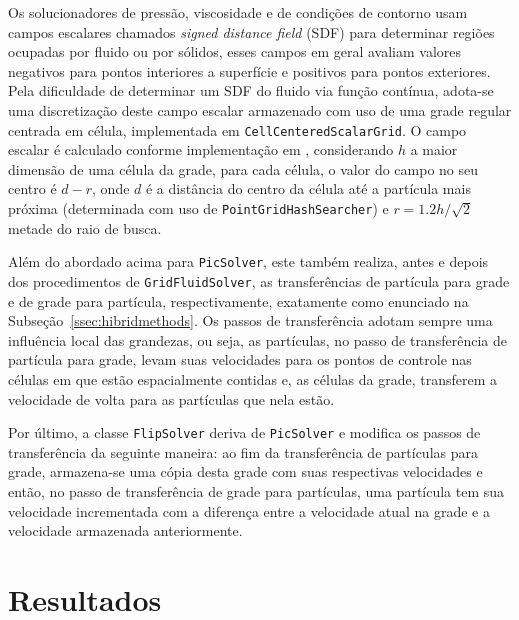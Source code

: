 \documentclass[12pt,a4paper,dvipsnames]{article}
\newcommand{\ssecref}[1]{Subseção~\ref{#1}}
\begin{document}
Os solucionadores de pressão, viscosidade e de condições de contorno usam campos escalares chamados \textit{signed distance field} (SDF) para determinar regiões ocupadas por fluido ou por sólidos, esses campos em geral avaliam valores negativos para pontos interiores a superfície e positivos para pontos exteriores. Pela dificuldade de determinar um SDF do fluido via função contínua, adota-se uma discretização deste campo escalar armazenado com uso de uma grade regular centrada em célula, implementada em \texttt{CellCenteredScalarGrid}. O campo escalar é calculado conforme implementação em \cite{kim_2017}, considerando $h$ a maior dimensão de uma célula da grade, para cada célula, o valor do campo no seu centro é $d - r$, onde $d$ é a distância do centro da célula até a partícula mais próxima (determinada com uso de \texttt{PointGridHashSearcher}) e $r = 1.2h/\sqrt{2}$ metade do raio de busca.

Além do abordado acima para \texttt{PicSolver}, este também realiza, antes e depois dos procedimentos de \texttt{GridFluidSolver}, as transferências de partícula para grade e de grade para partícula, respectivamente, exatamente como enunciado na \ssecref{ssec:hibridmethods}. Os passos de transferência adotam sempre uma influência local das grandezas, ou seja, as partículas, no passo de transferência de partícula para grade, levam suas velocidades para os pontos de controle nas células em que estão espacialmente contidas e, as células da grade, transferem a velocidade de volta para as partículas que nela estão.

Por último, a classe \texttt{FlipSolver} deriva de \texttt{PicSolver} e modifica os passos de transferência da seguinte maneira: ao fim da transferência de partículas para grade, armazena-se uma cópia desta grade com suas respectivas velocidades e então, no passo de transferência de grade para partículas, uma partícula tem sua velocidade incrementada com a diferença entre a velocidade atual na grade e a velocidade armazenada anteriormente.



\section{Resultados}
\label{sec:results}
\end{document}

